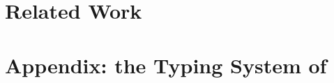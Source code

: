 \documentclass[preprint,nocopyrightspace]{sigplanconf}
\begin{document}
\section{Related Work}
\label{sec:relwork}




%

{}


\newpage
\appendix 
\section{Appendix: the Typing System of \HOp}
\label{app:types}


\onecolumn
%
%


\end{document}
